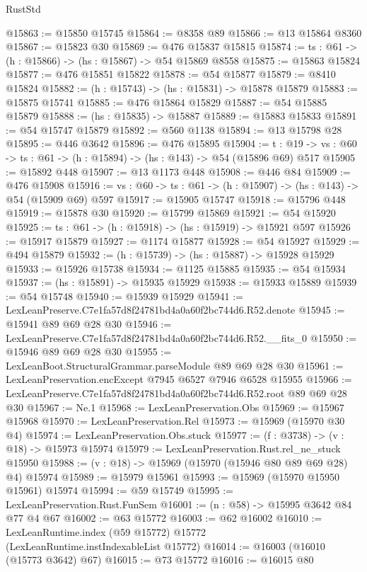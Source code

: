 \begin{lexlean}{RustStd}
\begin{coremodule}
@15863 := @15850 @15745
@15864 := @8358 @89
@15866 := @13 @15864 @8360
@15867 := @15823 @30
@15869 := @476 @15837 @15815
@15874 := {ts : @61} -> (h : @15866) -> (hs : @15867) -> @54 @15869 @8558
@15875 := @15863 @15824
@15877 := @476 @15851 @15822
@15878 := @54 @15877
@15879 := @8410 @15824
@15882 := (h : @15743) -> (hs : @15831) -> @15878 @15879
@15883 := @15875 @15741
@15885 := @476 @15864 @15829
@15887 := @54 @15885 @15879
@15888 := (hs : @15835) -> @15887
@15889 := @15883 @15833
@15891 := @54 @15747 @15879
@15892 := @560 @1138
@15894 := @13 @15798 @28
@15895 := @446 @3642
@15896 := @476 @15895
@15904 := {t : @19} ->
  {vs : @60} -> {ts : @61} -> (h : @15894) -> (hs : @143) -> @54 (@15896 @69) @517
@15905 := @15892 @448
@15907 := @13 @1173 @448
@15908 := @446 @84
@15909 := @476 @15908
@15916 := {vs : @60} -> {ts : @61} -> (h : @15907) -> (hs : @143) -> @54 (@15909 @69) @597
@15917 := @15905 @15747
@15918 := @15796 @448
@15919 := @15878 @30
@15920 := @15799 @15869
@15921 := @54 @15920
@15925 := {ts : @61} -> (h : @15918) -> (hs : @15919) -> @15921 @597
@15926 := @15917 @15879
@15927 := @1174 @15877
@15928 := @54 @15927
@15929 := @494 @15879
@15932 := (h : @15739) -> (hs : @15887) -> @15928 @15929
@15933 := @15926 @15738
@15934 := @1125 @15885
@15935 := @54 @15934
@15937 := (hs : @15891) -> @15935 @15929
@15938 := @15933 @15889
@15939 := @54 @15748
@15940 := @15939 @15929
@15941 := LexLeanPreserve.C7e1fa57d8f24781bd4a0a60f2bc744d6.R52.denote
@15945 := @15941 @89 @69 @28 @30
@15946 := LexLeanPreserve.C7e1fa57d8f24781bd4a0a60f2bc744d6.R52.__fits_0
@15950 := @15946 @89 @69 @28 @30
@15955 := LexLeanBoot.StructuralGrammar.parseModule @89 @69 @28 @30
@15961 := LexLeanPreservation.encExcept @7945 @6527 @7946 @6528 @15955
@15966 := LexLeanPreserve.C7e1fa57d8f24781bd4a0a60f2bc744d6.R52.root @89 @69 @28 @30
@15967 := Ne.{1}
@15968 := LexLeanPreservation.Obs
@15969 := @15967 @15968
@15970 := LexLeanPreservation.Rel
@15973 := @15969 (@15970 @30 @4)
@15974 := LexLeanPreservation.Obs.stuck
@15977 := (f : @3738) -> (v : @18) -> @15973 @15974
@15979 := LexLeanPreservation.Rust.rel_ne_stuck @15950
@15988 := (v : @18) -> @15969 (@15970 (@15946 @80 @89 @69 @28) @4) @15974
@15989 := @15979 @15961
@15993 := @15969 (@15970 @15950 @15961) @15974
@15994 := @59 @15749
@15995 := LexLeanPreservation.Rust.FunSem
@16001 := (n : @58) -> @15995 @3642 @84 @77 @4 @67
@16002 := @63 @15772
@16003 := @62 @16002
@16010 := LexLeanRuntime.index (@59 @15772) @15772 (LexLeanRuntime.instIndexableList @15772)
@16014 := @16003 (@16010 (@15773 @3642) @67)
@16015 := @73 @15772
@16016 := @16015 @80

\end{coremodule}
\end{lexlean}

